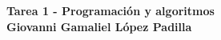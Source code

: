 \begin{center}
	\textbf{
		\textcolor{title}{Tarea 1 - Programación y algoritmos\\ Giovanni Gamaliel López Padilla}}
\end{center}
